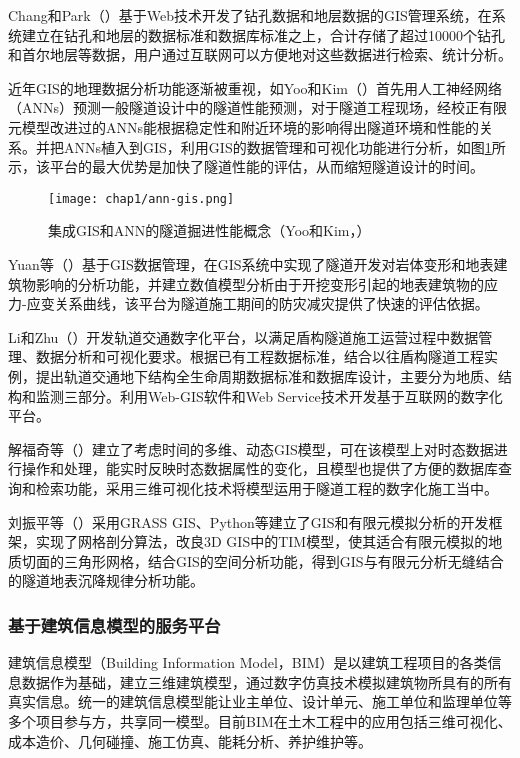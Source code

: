 Chang和Park（\citeyear{chang2004development}）基于Web技术开发了钻孔数据和地层数据的GIS管理系统，在系统建立在钻孔和地层的数据标准和数据库标准之上，合计存储了超过10000个钻孔和首尔地层等数据，用户通过互联网可以方便地对这些数据进行检索、统计分析。

近年GIS的地理数据分析功能逐渐被重视，如Yoo和Kim（\citeyear{yoo2007tunneling}）首先用人工神经网络（ANNs）预测一般隧道设计中的隧道性能预测，对于隧道工程现场，经校正有限元模型改进过的ANNs能根据稳定性和附近环境的影响得出隧道环境和性能的关系。并把ANNs植入到GIS，利用GIS的数据管理和可视化功能进行分析，如图\ref{fig:集成GIS和ANN的隧道掘进性能概念}所示，该平台的最大优势是加快了隧道性能的评估，从而缩短隧道设计的时间。

\begin{figure}[!h]
	\centering
	\texttt{[image: chap1/ann-gis.png]}
	\caption{集成GIS和ANN的隧道掘进性能概念（Yoo和Kim，\citeyear{yoo2007tunneling}）}
	\label{fig:集成GIS和ANN的隧道掘进性能概念}
\end{figure}

Yuan等（\citeyear{yuan2012study}）基于GIS数据管理，在GIS系统中实现了隧道开发对岩体变形和地表建筑物影响的分析功能，并建立数值模型分析由于开挖变形引起的地表建筑物的应力-应变关系曲线，该平台为隧道施工期间的防灾减灾提供了快速的评估依据。

Li和Zhu（\citeyear{li2013development}）开发轨道交通数字化平台，以满足盾构隧道施工运营过程中数据管理、数据分析和可视化要求。根据已有工程数据标准，结合以往盾构隧道工程实例，提出轨道交通地下结构全生命周期数据标准和数据库设计，主要分为地质、结构和监测三部分。利用Web-GIS软件和Web Service技术开发基于互联网的数字化平台。

解福奇等（\citeyear{解福奇2009时态}）建立了考虑时间的多维、动态GIS模型，可在该模型上对时态数据进行操作和处理，能实时反映时态数据属性的变化，且模型也提供了方便的数据库查询和检索功能，采用三维可视化技术将模型运用于隧道工程的数字化施工当中。

刘振平等（\citeyear{刘振平20173d}）采用GRASS GIS、Python等建立了GIS和有限元模拟分析的开发框架，实现了网格剖分算法，改良3D GIS中的TIM模型，使其适合有限元模拟的地质切面的三角形网格，结合GIS的空间分析功能，得到GIS与有限元分析无缝结合的隧道地表沉降规律分析功能。

\subsubsection{基于建筑信息模型的服务平台}

建筑信息模型（Building Information Model，BIM）是以建筑工程项目的各类信息数据作为基础，建立三维建筑模型，通过数字仿真技术模拟建筑物所具有的所有真实信息。统一的建筑信息模型能让业主单位、设计单元、施工单位和监理单位等多个项目参与方，共享同一模型。目前BIM在土木工程中的应用包括三维可视化、成本造价、几何碰撞、施工仿真、能耗分析、养护维护等。

